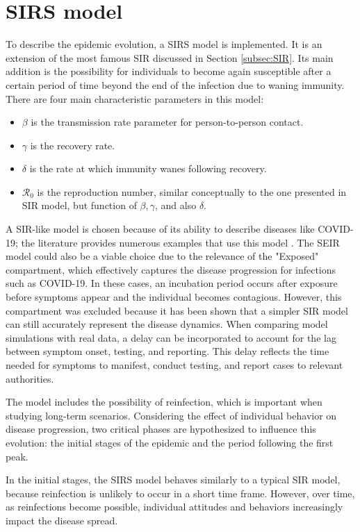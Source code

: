 \section{SIRS model}
\label{sec:SIRS}
To describe the epidemic evolution, a  SIRS model is implemented. It is an extension of the most famous SIR discussed in Section \ref{subsec:SIR}. Its main addition is the possibility for individuals to become again susceptible after a certain period of time beyond the end of the infection due to waning immunity. There are four main characteristic parameters in this model:
\begin{itemize}
	\item $\beta$ is the transmission rate parameter for person-to-person
	contact.
	\item $\gamma$ is the recovery rate.
	\item  $\delta$ is the rate at which immunity wanes following recovery.
	\item  $\mathcal{R}_0$ is the reproduction number, similar conceptually to the one presented in SIR model, but function of $\beta, \gamma$, and also $\delta$. 
\end{itemize}
A SIR-like model is chosen because of its ability to describe diseases like COVID-19; the literature provides numerous examples that use this model \cite{Dehning_2020, Li2022}. The SEIR model could also be a viable choice due to the relevance of the "Exposed" compartment, which effectively captures the disease progression for infections such as COVID-19. In these cases, an incubation period occurs after exposure before symptoms appear and the individual becomes contagious. However, this compartment was excluded because it has been shown \cite{Dehning_2020} that a simpler SIR model can still accurately represent the disease dynamics. When comparing model simulations with real data, a delay can be incorporated to account for the lag between symptom onset, testing, and reporting. This delay reflects the time needed for symptoms to manifest, conduct testing, and report cases to relevant authorities.

The model includes the possibility of reinfection, which is important when studying long-term scenarios. Considering the effect of individual behavior on disease progression, two critical phases are hypothesized to influence this evolution: the initial stages of the epidemic and the period following the first peak.

In the initial stages, the SIRS model behaves similarly to a typical SIR model, because reinfection is unlikely to occur in a short time frame. However, over time, as reinfections become possible, individual attitudes and behaviors increasingly impact the disease spread.


